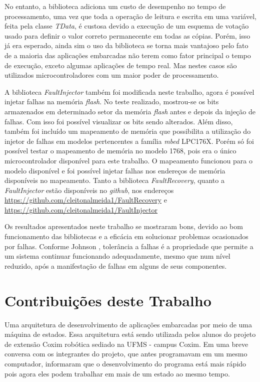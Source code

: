 No entanto, a biblioteca adiciona um custo de desempenho no tempo de processamento, uma vez que toda a operação de leitura e escrita em uma variável, feita pela classe \textit{TData}, é custosa devido a execução de um esquema de votação usado para definir o valor correto permanecente em todas as cópias. Porém, isso já era esperado, ainda sim o uso da biblioteca se torna mais vantajoso pelo fato de a maioria das aplicações embarcadas não terem como fator principal o tempo de execução, exceto algumas aplicações de tempo real. Mas nestes casos são utilizados microcontroladores com um maior poder de processamento. 

A biblioteca \textit{FaultInjector} também foi modificada neste trabalho, agora é possível injetar falhas na memória \textit{flash}. No teste realizado, mostrou-se os bits armazenados em determinado setor da memória \textit{flash} antes e depois da injeção de falhas. Com isso foi possível visualizar os bits sendo alterados. Além disso, também foi incluído um mapeamento de memória que possibilita a utilização do injetor de falhas em modelos pertencentes a família \textit{mbed} LPC176X. Porém só foi possível testar o mapeamento de memória no modelo 1768, pois era o único microcontrolador disponível para este trabalho. O mapeamento funcionou para o modelo disponível e foi possível injetar falhas nos endereços de memória disponíveis no mapeamento. Tanto a biblioteca \textit{FaultRecovery}, quanto a \textit{FaultInjector} estão disponíveis no \textit{github}, nos endereços \url{https://github.com/cleitonalmeida1/FaultRecovery} e \url{https://github.com/cleitonalmeida1/FaultInjector}

Os resultados apresentados neste trabalho se mostraram bons, devido ao bom funcionamento das bibliotecas e a eficácia em solucionar problemas ocasionados por falhas. Conforme Johnson \cite{Johnson:1984}, tolerância a falhas é a propriedade que permite a um sistema continuar funcionando adequadamente, mesmo que num nível reduzido, após a manifestação de falhas em alguns de seus componentes.

\section {Contribuições deste Trabalho}

Uma arquitetura de desenvolvimento de aplicações embarcadas por meio de uma máquina de estados. Essa arquitetura está sendo utilizada pelos alunos do projeto de extensão Coxim robótica sediado na UFMS - campus Coxim. Em uma breve conversa  com os integrantes do projeto, que antes programavam em um mesmo computador, informaram que o desenvolvimento do programa está mais rápido pois agora eles podem trabalhar em mais de um estado ao mesmo tempo.

